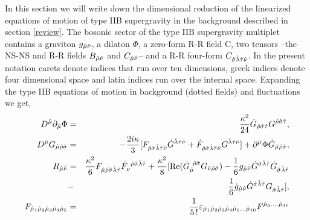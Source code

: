 \documentclass[12pt,epsf,a4paper]{article}
\begin{document}
In this section we will write down the dimensional reduction of the linearized equations of 
motion of type IIB supergravity in the background described in section \ref{review}.
The bosonic sector of the type IIB supergravity multiplet contains a graviton 
$g_{\hat \mu \hat \nu}$, a dilaton $\Phi$, a zero-form R-R field C, 
two tensors --the NS-NS and R-R fields $B_{\hat \mu \hat \nu}$ and 
$C_{\hat \mu \hat \nu}$-- and a R-R four-form $C_{\hat \sigma \hat \lambda \hat \tau \hat \nu}$. In the present
notation carets denote indices that run over ten dimensions, greek indices 
denote four dimensional space and latin indices run over the internal space.
Expanding the type IIB equations of motion \cite{Schwarz} 
in background (dotted fields) and fluctuations we get,
\begin{eqnarray}
D^{\hat \mu}\partial_{\hat \mu} \Phi& =& \frac{\kappa ^2}{24} 
{\dot G}_{\hat \rho \hat \sigma \hat \tau} G^{\hat \rho \hat \sigma \hat \tau},  \\
D^{\hat \mu}G_{\hat \mu \hat \rho \hat \sigma}& =& - \frac {2 i \kappa}{3} [F_{\hat \rho \hat \sigma \hat \lambda \hat \tau \hat \nu} 
{\dot G}^{ \hat \lambda \hat \tau \hat \nu} + {\dot F}_{\hat \rho \hat \sigma \hat \lambda \hat \tau \hat \nu} G^{
\hat \lambda \hat \tau \hat \nu}] + \partial^{\hat \mu} \Phi {\dot G}_{\hat \mu \hat \rho \hat \sigma}, \\
R_{\hat \mu \hat \nu}&=& \frac {\kappa^2}{6} F_{\hat \mu \hat \rho \hat \sigma \hat \lambda \hat \tau } 
{\dot F}_{\nu}^{\: \: \hat \rho \hat \sigma \hat \lambda \hat \tau } + 
\frac{\kappa^2}{8}[ \hbox {Re}({\dot G}_{\hat \mu}^{\: \:\hat \rho \hat \sigma}G_{\hat \nu \hat \rho \hat \sigma}) 
- \frac{1}{6}g_{\hat \mu \hat \nu}{\dot G}^{ \hat \sigma \hat \lambda \hat \tau}{\dot G}_{\hat \sigma \hat \lambda \hat \tau} 
\nonumber \\
&-&\frac{1}{6} {\dot g}_{\hat \mu \hat \nu} {\dot G}^{ \hat \sigma \hat \lambda \hat \tau} G_{\hat \sigma 
\hat \lambda \hat \tau}], \\
F_{\hat \mu_1 \hat \mu_2 \hat \mu_3 \hat \mu_4 \hat \mu_5 } & =& \frac {1}{5 \, !}
\varepsilon_{\hat \mu_1 \hat \mu_2 \hat \mu_3 \hat \mu_4 \hat \mu_5 ...\hat \mu_{10}}F^{\hat \mu_6....\hat \mu_{10}}
\end{eqnarray}
\end{document}
